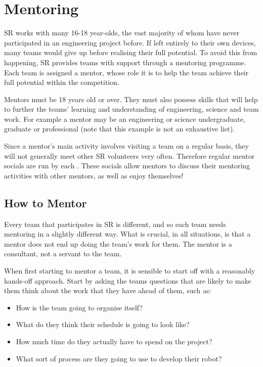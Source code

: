 \section{Mentoring}

SR works with many 16-18 year-olds, the vast majority of whom have never participated in an engineering project before.  If left entirely to their own devices, many teams would give up before realising their full potential.  To avoid this from happening, SR provides teams with support through a mentoring programme.  Each team is assigned a mentor, whose role it is to help the team achieve their full potential within the competition.

Mentors must be 18 years old or over.  They must also possess skills that will help to further the teams' learning and understanding of engineering, science and team work. For example a mentor may be an engineering or science undergraduate, graduate or professional (note that this example is not an exhaustive list).

Since a mentor's main activity involves visiting a team on a regular basis, they will not generally meet other SR volunteers very often.  Therefore regular mentor socials are run by each .  These socials allow mentors to discuss their mentoring activities with other mentors, as well as enjoy themselves!

\subsection{How to Mentor}
Every team that participates in SR is different, and so each team needs mentoring in a slightly different way.  What is crucial, in all situations, is that a mentor does not end up doing the team's work for them.  The mentor is a consultant, not a servant to the team.

When first starting to mentor a team, it is sensible to start off with a reasonably hands-off approach.  Start by asking the teams questions that are likely to make them think about the work that they have ahead of them, such as:
\begin{itemize}
\item How is the team going to organise itself?
\item What do they think their schedule is going to look like?
\item How much time do they actually have to spend on the project?
\item What sort of process are they going to use to develop their robot?
\end{itemize}

